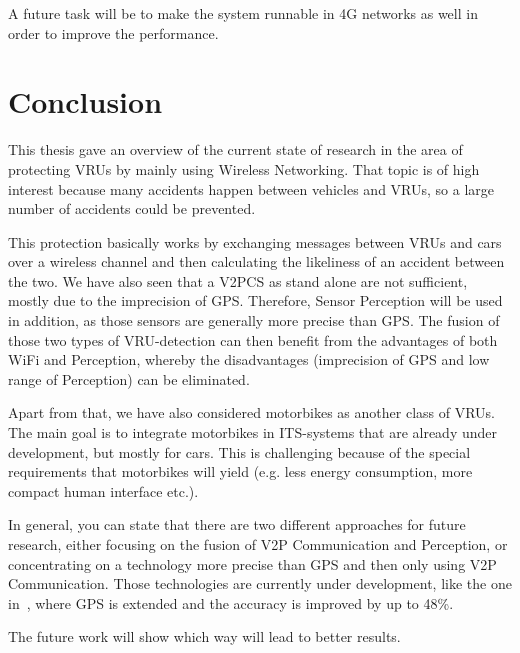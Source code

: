 \documentclass[]{ccs-thesis}
\begin{document}
A future task will be to make the system runnable in 4G networks as well in order to improve the performance.

\chapter{Conclusion}
\label{chap:conclusion}


This thesis gave an overview of the current state of research in the area of protecting \acp{VRU} by mainly using Wireless Networking. That topic is of high interest because many accidents happen between vehicles and \acp{VRU}, so a large number of accidents could be prevented.

This protection basically works by exchanging messages between \acp{VRU} and cars over a wireless channel and then calculating the likeliness of an accident between the two. We have also seen that a \ac{V2PCS} as stand alone are not sufficient, mostly due to the imprecision of GPS. Therefore, Sensor Perception will be used in addition, as those sensors are generally more precise than GPS. The fusion of those two types of \ac{VRU}-detection can then benefit from the advantages of both WiFi and Perception, whereby the disadvantages (imprecision of GPS and low range of Perception) can be eliminated.

Apart from that, we have also considered motorbikes as another class of \acp{VRU}. The main goal is to integrate motorbikes in \ac{ITS}-systems that are already under development, but mostly for cars. This is challenging because of the special requirements that motorbikes will yield (e.g. less energy consumption, more compact human interface etc.).

In general, you can state that there are two different approaches for future research, either focusing on the fusion of V2P Communication and Perception, or concentrating on a technology more precise than GPS and then only using V2P Communication. Those technologies are currently under development, like the one in~\cite{doppler}, where GPS is extended and the accuracy is improved by up to 48\%. 

The future work will show which way will lead to better results.



\cleardoublepage

\listofabbreviations
\clearpage

\listoffigures
\clearpage

\printbibliography
\end{document}
